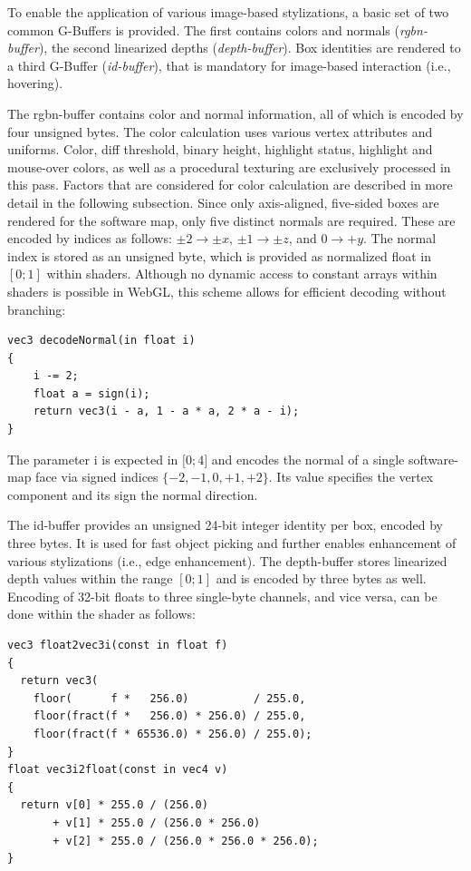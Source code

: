 \documentclass[annual]{acmsiggraph}
\begin{document}
To enable the application of various image-based stylizations, a basic set of two common G-Buffers is provided.
The first contains colors and normals (\emph{rgbn-buffer}), the second linearized depths (\emph{depth-buffer}).
Box identities are rendered to a third G-Buffer (\emph{id-buffer}), that is mandatory for image-based interaction (i.e., hovering).

The rgbn-buffer contains color and normal information, all of which is encoded by four unsigned bytes.
The color calculation uses various vertex attributes and uniforms.
Color, diff threshold, binary height, highlight status, highlight and mouse-over colors, as well as a procedural texturing are exclusively processed in this pass.
Factors that are considered for color calculation are described in more detail in the following subsection.
Since only axis-aligned, five-sided boxes are rendered for the software map, only five distinct normals are required.
These are encoded by indices as follows: $\pm 2 \rightarrow \pm x$, $\pm 1 \rightarrow \pm z$, and $0 \rightarrow +y$.
The normal index is stored as an unsigned byte, which is provided as normalized float in $[0;1]$ within shaders.
Although no dynamic access to constant arrays within shaders is possible in WebGL, this scheme allows for efficient decoding without branching:
\\
\begin{lstlisting}
vec3 decodeNormal(in float i)
{
	i -= 2;
	float a = sign(i);
	return vec3(i - a, 1 - a * a, 2 * a - i);
}
\end{lstlisting}

The parameter i is expected in $\lbrack 0;4 \rbrack$ and encodes the normal of a single software-map face via signed indices $\{-2,-1, 0,+1,+2\}$. Its value specifies the vertex component and its sign the normal direction.

The id-buffer provides an unsigned 24-bit integer identity per box, encoded by three bytes.
It is used for fast object picking and further enables enhancement of various stylizations (i.e., edge enhancement).
The depth-buffer stores linearized depth values within the range $[0;1]$ and is encoded by three bytes as well.
Encoding of 32-bit floats to three single-byte channels, and vice versa, can be done within the shader as follows:
\\
\begin{lstlisting}
vec3 float2vec3i(const in float f)
{
  return vec3(
    floor(      f *   256.0)          / 255.0,
    floor(fract(f *   256.0) * 256.0) / 255.0,
    floor(fract(f * 65536.0) * 256.0) / 255.0);
}
float vec3i2float(const in vec4 v)
{
  return v[0] * 255.0 / (256.0)
       + v[1] * 255.0 / (256.0 * 256.0)
       + v[2] * 255.0 / (256.0 * 256.0 * 256.0);
}
\end{lstlisting}
\end{document}
